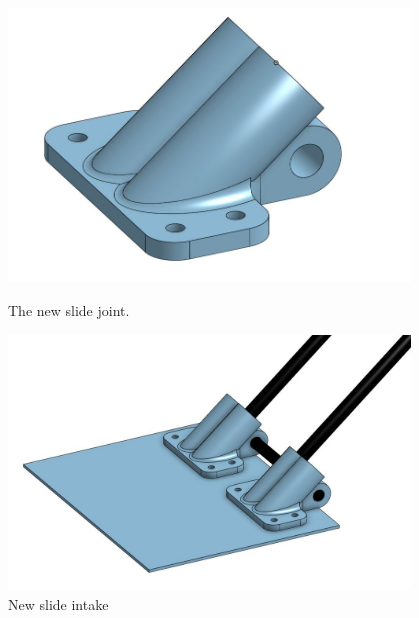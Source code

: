  

\begin{figure}[ht]
\centering
\begin{minipage}[b]{.48\textwidth}
  \centering
  \includegraphics[width=0.95\textwidth]{Meetings/October/10-30-21/10-30-21_CAD_Figure2 - Nathan Forrer.JPG}
  \caption{The new slide joint.}
  \label{fig:pic1}
\end{minipage}%
\hfill%
\begin{minipage}[b]{.48\textwidth}
  \centering
  \includegraphics[width=0.95\textwidth]{Meetings/October/10-30-21/10-30-21_CAD_Figure3 - Nathan Forrer.JPG}
  \caption{New slide intake}
  \label{fig:pic2}
\end{minipage}
\end{figure}

